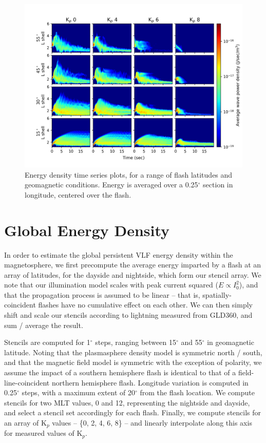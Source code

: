 \begin{figure}
\begin{center}
\includegraphics[angle=-90]{figures/wave_energy_timeseries_vs_L.png}
\caption[Energy density vs time vs L-shell]{Energy density time series plots, for a range of flash latitudes and geomagnetic conditions. Energy is averaged over a 0.25$^\circ$ section in longitude, centered over the flash.}
\label{fig:wave_energy_timeseries}
\end{center}
\end{figure}

\section{Global Energy Density}
In order to estimate the global persistent VLF energy density within the magnetosphere, we first precompute the average energy imparted by a flash at an array of latitudes, for the dayside and nightside, which form our stencil array. We note that our illumination model scales with peak current squared ($E \propto I_0^2$), and that the propagation process is assumed to be linear -- that is, spatially-coincident flashes have no cumulative effect on each other. We can then simply shift and scale our stencils according to lightning measured from GLD360, and sum / average the result. 

Stencils are computed for 1$^\circ$ steps, ranging between 15$^\circ$ and 55$^\circ$ in geomagnetic latitude. Noting that the plasmasphere density model is symmetric north / south, and that the magnetic field model is symmetric with the exception of polarity, we assume the impact of a southern hemisphere flash is identical to that of a field-line-coincident northern hemisphere flash. Longitude variation is computed in 0.25$^\circ$ steps, with a maximum extent of 20$^\circ$ from the flash location. We compute stencils for two MLT values, 0 and 12, representing the nightside and dayside, and select a stencil set accordingly for each flash. Finally, we compute stencils for an array of K$_p$ values -- \{0, 2, 4, 6, 8\} -- and linearly interpolate along this axis for measured values of K$_p$.

